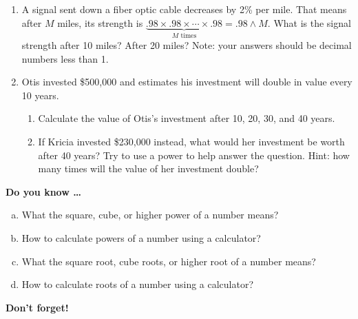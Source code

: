 \begin{enumerate}
\newpage %

\item A signal sent down a fiber optic cable decreases by 2\% per mile.  That means after $M$ miles, its strength is $\underbrace{.98 \times .98 \times \cdots \times .98}_{M \text{ times}} = .98 \land M$.  What is the signal strength after 10 miles? After 20 miles? Note: your answers should be decimal numbers less than 1. \vfill

\item Otis invested \$500,000 and estimates his investment will double in value every 10 years.  
\begin{enumerate}
\item Calculate the value of Otis's investment after 10, 20, 30, and 40 years.   \vfill
\item If Kricia invested \$230,000 instead, what would her investment be worth after 40 years?  Try to use a power to help answer the question. Hint:  how many times will the value of her investment double? \vfill
\end{enumerate}

\end{enumerate}

\newpage %



\bigskip

\noindent \textbf{Do you know \ldots}

\begin{enumerate} [(a)]
\item What the square, cube, or higher power of a number means? \vfill
\item How to calculate powers of a number using a calculator? \vfill
\item What the square root, cube roots, or higher root of a number means? \vfill
\item How to calculate roots of a number using a calculator? \vfill
\end{enumerate}

\noindent \textbf{Don't forget!}
\vfill \vfill \vfill




